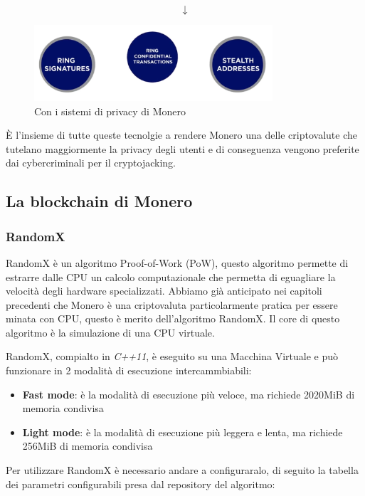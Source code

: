 \documentclass[12pt,a4paper]{article}
\begin{document}
$$ \downarrow $$

\begin{figure}[ht]
    \centering
    \includegraphics[width=0.79\textwidth]{./images/after.png}
    \caption{Con i sistemi di privacy di Monero}
    \label{fig:summary}
\end{figure}

È l'insieme di tutte queste tecnolgie a rendere Monero una delle criptovalute che tutelano maggiormente la privacy degli utenti e di conseguenza vengono preferite dai cybercriminali per il cryptojacking.

\subsection{La blockchain di Monero}

\subsubsection*{RandomX}
RandomX è un algoritmo Proof-of-Work (PoW), questo algoritmo permette di
estrarre dalle CPU un calcolo computazionale che permetta di eguagliare la
velocità degli hardware specializzati. Abbiamo già anticipato nei capitoli
precedenti che Monero è una criptovaluta particolarmente pratica per essere
minata con CPU, questo è merito dell'algoritmo RandomX. Il core di questo
algoritmo è la simulazione di una CPU virtuale.

RandomX, compialto in \textit{C++11}, è eseguito su una Macchina Virtuale e può
funzionare in 2 modalità di esecuzione intercammbiabili:

\begin{itemize}
    \item \textbf{Fast mode}: è la modalità di esecuzione più veloce, ma
    richiede 2020MiB di memoria condivisa
    \item \textbf{Light mode}: è la modalità di esecuzione più leggera e lenta,
    ma richiede 256MiB di memoria condivisa
\end{itemize}

Per utilizzare RandomX è necessario andare a configuraralo, di seguito la
tabella dei parametri configurabili presa dal repository del algoritmo:
\end{document}
